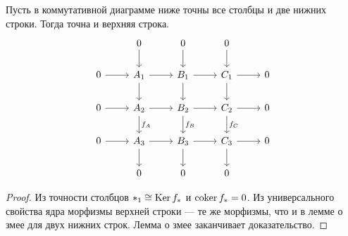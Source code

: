 \documentclass[../main.tex]{subfiles}
\begin{document}
  \begin{to_suj}\label{B:nine_lemma}
    Пусть в коммутативной диаграмме ниже точны все столбцы и две нижних строки. Тогда точна и верхняя строка.
    \begin{equation*}
      \begin{tikzcd}
	& 0 & 0 & 0 \\
	0 & {A_1} & {B_1} & {C_1} & 0 \\
	0 & {A_2} & {B_2} & {C_2} & 0 \\
	0 & {A_3} & {B_3} & {C_3} & 0 \\
	& 0 & 0 & 0
	\arrow[from=1-2, to=2-2]
	\arrow[from=2-2, to=3-2]
	\arrow["{f_A}", from=3-2, to=4-2]
	\arrow[from=1-3, to=2-3]
	\arrow[from=2-3, to=3-3]
	\arrow["{f_B}", from=3-3, to=4-3]
	\arrow[from=4-3, to=5-3]
	\arrow[from=1-4, to=2-4]
	\arrow[from=2-4, to=3-4]
	\arrow["{f_C}", from=3-4, to=4-4]
	\arrow[from=4-4, to=5-4]
	\arrow[from=2-1, to=2-2]
	\arrow[from=2-2, to=2-3]
	\arrow[from=2-3, to=2-4]
	\arrow[from=2-4, to=2-5]
	\arrow[from=3-1, to=3-2]
	\arrow[from=3-2, to=3-3]
	\arrow[from=3-3, to=3-4]
	\arrow[from=3-4, to=3-5]
	\arrow[from=4-1, to=4-2]
	\arrow[from=4-2, to=4-3]
	\arrow[from=4-3, to=4-4]
	\arrow[from=4-4, to=4-5]
	\arrow[from=4-2, to=5-2]
\end{tikzcd}
    \end{equation*}
  \end{to_suj}
  \begin{proof}
    Из точности столбцов $*_1\cong\mathop{\mathrm{Ker}}\nolimits f_*$ и $\operatorname{coker} f_*=0$. Из универсального свойства ядра морфизмы верхней строки --- те же морфизмы, что и в лемме о змее для двух нижних строк. Лемма о змее заканчивает доказательство.
  \end{proof}
\end{document}
